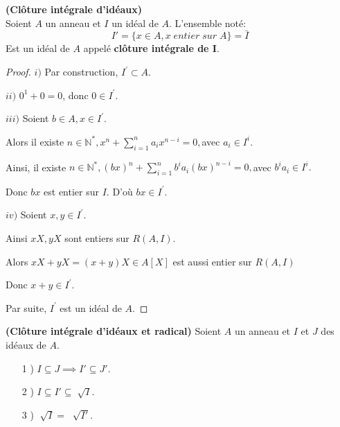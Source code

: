 \begin{moncorollaire}\textbf{(Clôture intégrale d'idéaux)}\cite{2}\\
	Soient $A$ un anneau et $I$ un idéal de $A$.
	L'ensemble noté: 
	\[ I'=\{x \in A, x \; entier \; sur \; A \} = \bar{I} \]
	Est un idéal de $A$ appelé \textbf{clôture intégrale de I}.
\end{moncorollaire}
\begin{proof}
	$i)$ Par construction, $I^{\prime }\subset A.$
	
	$ii)$ $0^{1}+0=0$, donc $0\in I^{\prime }.$
	
	$iii)$ Soient $b\in A,x\in I^{\prime }.$
	
	Alors il existe $n\in \mathbb{N}^{\ast },x^{n}+\sum\limits_{i=1}^{n}a_{i}x^{n-i}=0,$avec $a_{i}\in I^{i}.$
	
	Ainsi, il existe $n\in \mathbb{N}^{\ast },(bx)^{n}+\sum\limits_{i=1}^{n}b^{i}a_{i}(bx)^{n-i}=0,$avec $%
	b^{i}a_{i}\in I^{i}.$
	
	Donc $bx$ est entier sur $I.$ D'où $bx\in I^{\prime }.$
	
	$iv)$ Soient $x,y\in I^{\prime }.$
	
	Ainsi $xX,yX$ sont entiers sur $R(A,I).$
	
	Alors $xX+yX=(x+y)X\in A[X]$ est aussi entier sur $R(A,I)$
	
	Donc $x+y\in I^{\prime }.$
	
	Par suite, $I^{\prime }$ est un idéal de $A.$
\end{proof}
\begin{maremarque}\textbf{(Clôture intégrale d'idéaux et radical)}\cite{2}
	Soient $A$ un anneau et $I$ et $J$ des idéaux de $A$.
	\begin{enumerate}
		\item[1] ) $I \subseteq J \implies I' \subseteq J' $.
		\item[2] ) $I \subseteq I' \subseteq \sqrt[]{I} $.
		\item[3] ) $\sqrt[]{I} = \; \sqrt[]{I'} $.
	\end{enumerate}
\end{maremarque}
